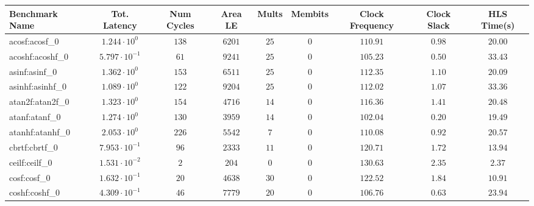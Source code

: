 \begin{tabular}{|l|c|c|c|c|c|c|c|c|}
\hline
Benchmark Name               & Tot. Latency            & Num Cycles & Area LE    & Mults   & Membits  & Clock Frequency & Clock Slack & HLS Time(s) \\
\hline
acosf:acosf\_0               & $ 1.244 \cdot 10^{0}  $ & $ 138    $ & $ 6201   $ & $ 25  $ & $ 0    $ & $ 110.91      $ & $ 0.98    $ & $ 20.00   $ \\
acoshf:acoshf\_0             & $ 5.797 \cdot 10^{-1} $ & $ 61     $ & $ 9241   $ & $ 25  $ & $ 0    $ & $ 105.23      $ & $ 0.50    $ & $ 33.43   $ \\
asinf:asinf\_0               & $ 1.362 \cdot 10^{0}  $ & $ 153    $ & $ 6511   $ & $ 25  $ & $ 0    $ & $ 112.35      $ & $ 1.10    $ & $ 20.09   $ \\
asinhf:asinhf\_0             & $ 1.089 \cdot 10^{0}  $ & $ 122    $ & $ 9204   $ & $ 25  $ & $ 0    $ & $ 112.02      $ & $ 1.07    $ & $ 33.36   $ \\
atan2f:atan2f\_0             & $ 1.323 \cdot 10^{0}  $ & $ 154    $ & $ 4716   $ & $ 14  $ & $ 0    $ & $ 116.36      $ & $ 1.41    $ & $ 20.48   $ \\
atanf:atanf\_0               & $ 1.274 \cdot 10^{0}  $ & $ 130    $ & $ 3959   $ & $ 14  $ & $ 0    $ & $ 102.04      $ & $ 0.20    $ & $ 19.49   $ \\
atanhf:atanhf\_0             & $ 2.053 \cdot 10^{0}  $ & $ 226    $ & $ 5542   $ & $ 7   $ & $ 0    $ & $ 110.08      $ & $ 0.92    $ & $ 20.57   $ \\
cbrtf:cbrtf\_0               & $ 7.953 \cdot 10^{-1} $ & $ 96     $ & $ 2333   $ & $ 11  $ & $ 0    $ & $ 120.71      $ & $ 1.72    $ & $ 13.94   $ \\
ceilf:ceilf\_0               & $ 1.531 \cdot 10^{-2} $ & $ 2      $ & $ 204    $ & $ 0   $ & $ 0    $ & $ 130.63      $ & $ 2.35    $ & $ 2.37    $ \\
cosf:cosf\_0                 & $ 1.632 \cdot 10^{-1} $ & $ 20     $ & $ 4638   $ & $ 30  $ & $ 0    $ & $ 122.52      $ & $ 1.84    $ & $ 10.91   $ \\
coshf:coshf\_0               & $ 4.309 \cdot 10^{-1} $ & $ 46     $ & $ 7779   $ & $ 20  $ & $ 0    $ & $ 106.76      $ & $ 0.63    $ & $ 23.94   $ \\

\end{tabular}

